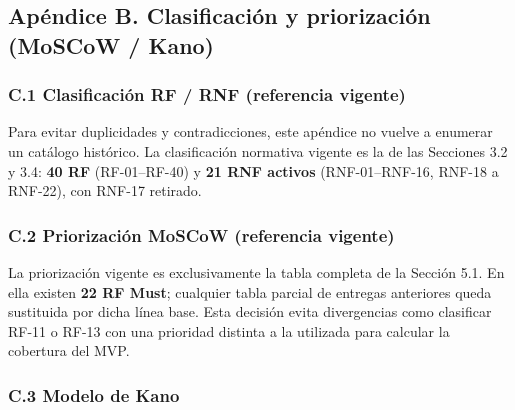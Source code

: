 \documentclass[11pt,a4paper]{article}
\begin{document}
	
	
	\subsection{Apéndice B. Clasificación y priorización (MoSCoW / Kano)}
	
	\subsubsection{C.1 Clasificación RF / RNF (referencia vigente)}
	Para evitar duplicidades y contradicciones, este apéndice no vuelve a enumerar un catálogo histórico. La clasificación normativa vigente es la de las Secciones 3.2 y 3.4: \textbf{40 RF} (RF-01--RF-40) y \textbf{21 RNF activos} (RNF-01--RNF-16, RNF-18 a RNF-22), con RNF-17 retirado.
	
	\subsubsection{C.2 Priorización MoSCoW (referencia vigente)}
	La priorización vigente es exclusivamente la tabla completa de la Sección 5.1. En ella existen \textbf{22 RF Must}; cualquier tabla parcial de entregas anteriores queda sustituida por dicha línea base. Esta decisión evita divergencias como clasificar RF-11 o RF-13 con una prioridad distinta a la utilizada para calcular la cobertura del MVP.
	
	\subsubsection{C.3 Modelo de Kano}
	
\end{document}
